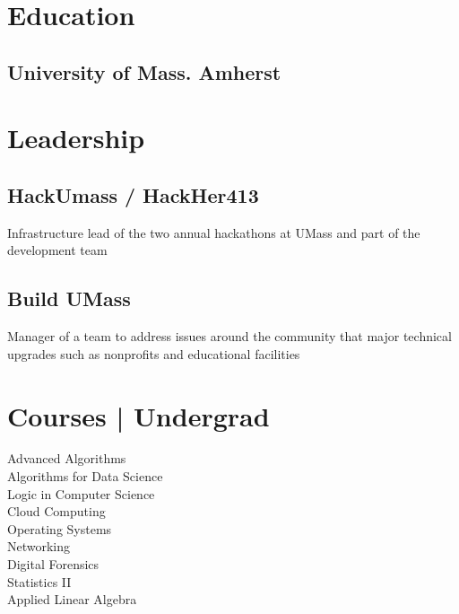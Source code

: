 \section{Education}

\subsection{University of Mass. Amherst}




\sectionsep


\section{Leadership}

\subsection{HackUmass / HackHer413}
Infrastructure lead of the two annual hackathons at UMass and part of the development team

\sectionsep

\subsection{Build UMass}
Manager of a team to address issues around the community that major technical upgrades such as nonprofits and educational facilities


\sectionsep


\section{Courses | Undergrad}
Advanced Algorithms \\
Algorithms for Data Science \\
Logic in Computer Science \\
Cloud Computing \\
Operating Systems \\
Networking \\
Digital Forensics \\
Statistics II \\
Applied Linear Algebra \\


